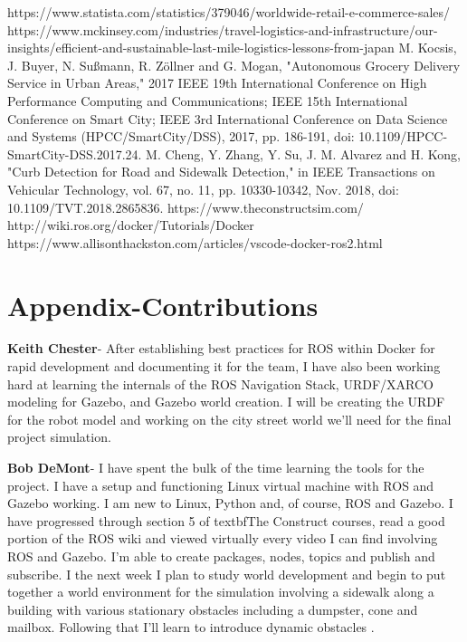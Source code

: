 \documentclass{article}
\begin{document}
\begin{multicols}{2}

\begin{thebibliography}{10}
 https://www.statista.com/statistics/379046/worldwide-retail-e-commerce-sales/
https://www.mckinsey.com/industries/travel-logistics-and-infrastructure/our-insights/efficient-and-sustainable-last-mile-logistics-lessons-from-japan
M. Kocsis, J. Buyer, N. Sußmann, R. Zöllner and G. Mogan, "Autonomous Grocery Delivery Service in Urban Areas," 2017 IEEE 19th International Conference on High Performance Computing and Communications; IEEE 15th International Conference on Smart City; IEEE 3rd International Conference on Data Science and Systems (HPCC/SmartCity/DSS), 2017, pp. 186-191, doi: 10.1109/HPCC-SmartCity-DSS.2017.24.
M. Cheng, Y. Zhang, Y. Su, J. M. Alvarez and H. Kong, "Curb Detection for Road and Sidewalk Detection," in IEEE Transactions on Vehicular Technology, vol. 67, no. 11, pp. 10330-10342, Nov. 2018, doi: 10.1109/TVT.2018.2865836.
 https://www.theconstructsim.com/
 http://wiki.ros.org/docker/Tutorials/Docker
 https://www.allisonthackston.com/articles/vscode-docker-ros2.html



\end{thebibliography}
\pagebreak
\section*{Appendix-Contributions}
\noindent \textbf{Keith Chester}-  After establishing best practices for ROS within Docker for rapid development and documenting it for the team, I have also been working hard at learning the internals of the ROS Navigation Stack, URDF/XARCO modeling for Gazebo, and Gazebo world creation. I will be creating the URDF for the robot model and working on the city street world we'll need for the final project simulation.

\bigskip

\noindent \textbf{Bob DeMont}- I have spent the bulk of the time learning the tools for the project.  I have a setup and functioning Linux virtual machine with ROS and Gazebo working.  I am new to Linux, Python and, of course, ROS and Gazebo.  I have progressed through section 5 of textbf{The Construct} courses, read a good portion of the ROS wiki and viewed virtually every video I can find involving ROS and Gazebo.  I'm able to create packages, nodes, topics and publish and subscribe.  I the next week I plan to study world development and begin to put together a world environment for the simulation involving a sidewalk along a building with various stationary obstacles including a dumpster, cone and mailbox.  Following that I'll learn to introduce dynamic obstacles .\\

\end{multicols}
\end{document}
